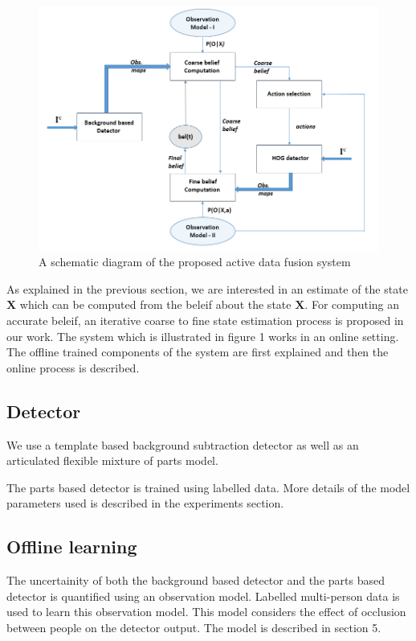 \documentclass[10pt,twocolumn,letterpaper]{article}
\begin{document}
\begin{figure}
\begin{center}
\includegraphics[width=12cm]{img/block_dia_cir.PNG}
\end{center}
   \caption{A schematic diagram of the proposed active data fusion system}
\label{fig:Block dia}
\end{figure}

As explained in the previous section, we are interested in an estimate of the state $\textbf{X}$ which can be computed from the beleif about the state $\textbf{X}$. For computing an accurate beleif, an iterative coarse to fine state estimation process is proposed in our work. The system which is illustrated in figure 1 works in an online setting. The offline trained components of the system are first explained and then the online process is described.

\subsection{Detector}
We use a template based background subtraction detector as well as an articulated flexible mixture of parts model.

The parts based detector is trained using labelled data. More details of the model parameters used is described in the experiments section.
 
\subsection{Offline learning}
 The uncertainity of both the background based detector and the parts based detector is quantified using an observation model. Labelled multi-person data is used to learn this observation model. This model considers the effect of occlusion between people on the detector output. The model is described in section 5.
\end{document}
